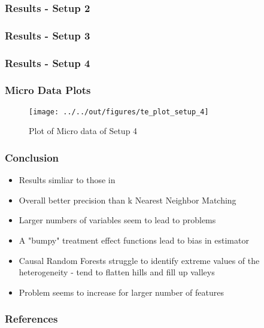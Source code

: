\documentclass[11pt]{beamer}
\begin{document}
\begin{frame}
    \frametitle{Results - Setup 2}
    
    

\end{frame}


\begin{frame}
    \frametitle{Results - Setup 3}
    
    

\end{frame}


\begin{frame}
    \frametitle{Results - Setup 4}
    
    

\end{frame}



\begin{frame}
    \frametitle{Micro Data Plots}
    
    \begin{figure}
        \caption{Plot of Micro data of Setup 4}
    
        \texttt{[image: ../../out/figures/te\_plot\_setup\_4]}

    \end{figure}

\end{frame}


\begin{frame}
    \frametitle{Conclusion}
    
    \begin{itemize}
        \item Results simliar to those in \citet{wa18}
        \item Overall better precision than k Nearest Neighbor Matching
        \item Larger numbers of variables seem to lead to problems
        \item A "bumpy" treatment effect functions lead to bias in estimator
        \item Causal Random Forests struggle to identify extreme values of the heterogeneity - tend to flatten hills and fill up valleys
        \item Problem seems to increase for larger number of features
    \end{itemize}

\end{frame}



 {
    \begin{frame}
        \frametitle{}
    \end{frame}

}

\begin{frame}[allowframebreaks]
    \frametitle{References}
    
    
    
\end{frame}
\end{document}

